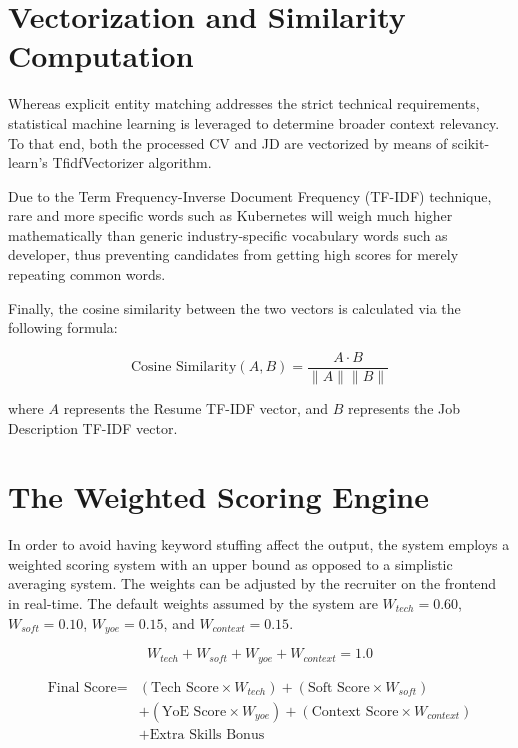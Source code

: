 \section{Vectorization and Similarity Computation}
Whereas explicit entity matching addresses the strict technical requirements, statistical machine learning is leveraged to determine broader context relevancy. To that end, both the processed CV and JD are vectorized by means of scikit-learn’s TfidfVectorizer algorithm.

Due to the Term Frequency-Inverse Document Frequency (TF-IDF) technique, rare and more specific words such as Kubernetes will weigh much higher mathematically than generic industry-specific vocabulary words such as developer, thus preventing candidates from getting high scores for merely repeating common words.

Finally, the cosine similarity between the two vectors is calculated via the following formula:

\begin{equation}
\text{Cosine Similarity}(A,B)=\frac{A \cdot B}{\|A\|\|B\|}
\end{equation}

where \(A\) represents the Resume TF-IDF vector, and \(B\) represents the Job Description TF-IDF vector.

\section{The Weighted Scoring Engine}
In order to avoid having keyword stuffing affect the output, the system employs a weighted scoring system with an upper bound as opposed to a simplistic averaging system. The weights can be adjusted by the recruiter on the frontend in real-time. The default weights assumed by the system are \(W_{tech}=0.60\), \(W_{soft}=0.10\), \(W_{yoe}=0.15\), and \(W_{context}=0.15\).

\begin{equation}
W_{tech}+W_{soft}+W_{yoe}+W_{context}=1.0
\end{equation}

\begin{equation}
\begin{aligned}
\text{Final Score} ={}&
(\text{Tech Score} \times W_{tech}) +
(\text{Soft Score} \times W_{soft})\\
&+(\text{YoE Score} \times W_{yoe}) +
(\text{Context Score} \times W_{context})\\
&+\text{Extra Skills Bonus}
\end{aligned}
\end{equation}

